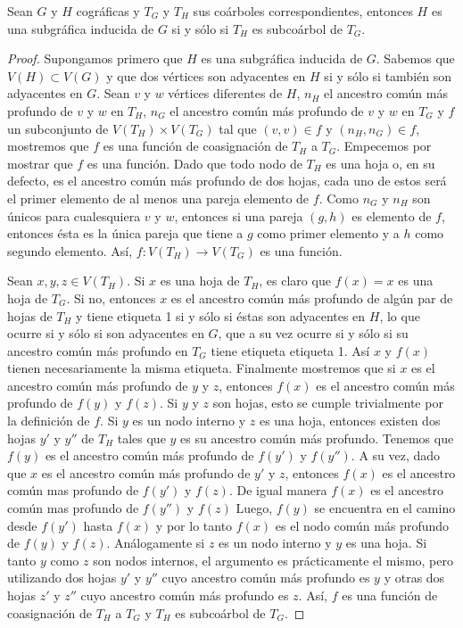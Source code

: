 \begin{lemma}\label{lema_subcoa_01}
    Sean $G$ y $H$ cográficas y $T_G$ y $T_H$ sus coárboles correspondientes, entonces $H$ es una subgráfica inducida de $G$ si y sólo si $T_H$ es subcoárbol de $T_G$.
\end{lemma}

\begin{proof}
    
    Supongamos primero que $H$ es una subgráfica inducida de $G$. Sabemos que
    $V(H)\subset V(G)$ y que dos vértices son adyacentes en $H$ si y sólo si
    también son adyacentes en $G$. Sean $v$ y $w$ vértices diferentes de $H$,
    $n_H$ el ancestro común más profundo de $v$ y $w$ en $T_H$, $n_G$ el
    ancestro común más profundo de $v$ y $w$ en $T_G$ y $f$ un subconjunto de
    $V(T_H)\times V(T_G)$ tal que $(v,v)\in f$ y $(n_H, n_G)\in f$, mostremos que
    $f$ es una función de coasignación de $T_H$ a $T_G$. Empecemos por mostrar
    que $f$ es una función. Dado que todo nodo de $T_H$ es una hoja o, en su
	defecto, es el ancestro común más profundo de dos hojas, cada uno de estos
	será el primer elemento de al menos una pareja elemento de $f$. Como $n_G$
	y $n_H$ son únicos para cualesquiera $v$ y $w$, entonces si una pareja 
	$(g,h)$ es elemento de $f$, entonces ésta es la única pareja que tiene a 
	$g$ como primer elemento y a $h$ como segundo elemento. Así, 
	$f:V(T_H)\rightarrow V(T_G)$ es una función. 
    
    Sean $x,y,z\in V(T_H)$. Si $x$ es una
    hoja de $T_H$, es claro que $f(x) = x$ es una hoja de $T_G$. Si no,
    entonces $x$ es el ancestro común más profundo de algún par de hojas de
    $T_H$ y tiene etiqueta 1 si y sólo si éstas son adyacentes en $H$, lo que
    ocurre si y sólo si son adyacentes en $G$, que a su vez ocurre si y sólo si
    su ancestro común más profundo en $T_G$ tiene etiqueta etiqueta 1. Así $x$
    y $f(x)$ tienen necesariamente la misma etiqueta. Finalmente mostremos que
    si $x$ es el ancestro común más profundo de $y$ y $z$, entonces $f(x)$ es
    el ancestro común más profundo de $f(y)$ y $f(z)$. Si $y$ y $z$ son hojas,
    esto se cumple trivialmente por la definición de $f$. Si $y$ es un nodo
    interno y $z$ es una hoja, entonces existen dos hojas $y'$ y $y''$ de $T_H$
    tales que $y$ es su ancestro común más profundo. Tenemos que $f(y)$ es el
    ancestro común más profundo de $f(y')$ y $f(y'')$. A su vez, dado que $x$
    es el ancestro común más profundo de $y'$ y $z$, entonces $f(x)$ es el
    ancestro común mas profundo de $f(y')$ y $f(z)$. De igual manera $f(x)$ es
    el ancestro común mas profundo de $f(y'')$ y $f(z)$ Luego, $f(y)$ se
    encuentra en el camino desde $f(y')$ hasta $f(x)$ y por lo tanto $f(x)$ es
    el nodo común más profundo de $f(y)$ y $f(z)$. Análogamente si $z$ es un
    nodo interno y $y$ es una hoja. Si tanto $y$ como $z$ son nodos internos,
    el argumento es prácticamente el mismo, pero utilizando dos hojas $y'$ y
    $y''$ cuyo ancestro común más profundo es $y$ y otras dos hojas $z'$ y
    $z''$ cuyo ancestro común más profundo es $z$. Así, $f$ es una función de
    coasignación de $T_H$ a $T_G$ y $T_H$ es subcoárbol de $T_G$.


\end{proof}
